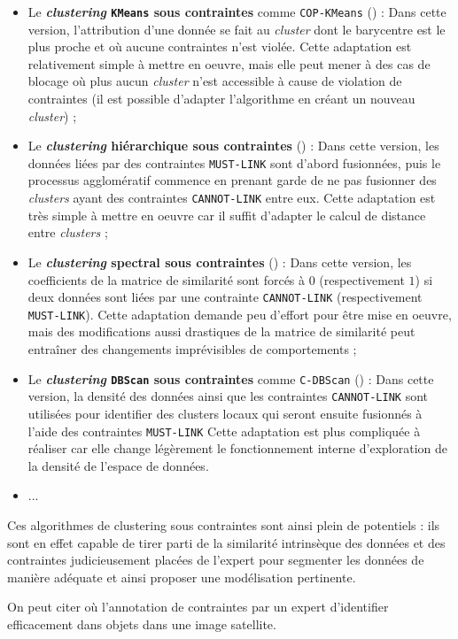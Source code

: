 		\begin{itemize}
			\item Le \textbf{\textit{clustering} \texttt{KMeans} sous contraintes} comme \texttt{COP-KMeans} (\cite{wagstaff-etal:2001:constrained-kmeans-clustering}) :
			Dans cette version, l'attribution d'une donnée se fait au \textit{cluster} dont le barycentre est le plus proche et où aucune contraintes n'est violée.
			Cette adaptation est relativement simple à mettre en oeuvre, mais elle peut mener à des cas de blocage où plus aucun \textit{cluster} n'est accessible à cause de violation de contraintes (il est possible d’adapter l'algorithme en créant un nouveau \textit{cluster}) ;
			\item Le \textbf{\textit{clustering} hiérarchique sous contraintes} (\cite{davidson-ravi:2005:agglomerative-hierarchical-clustering}) :
			Dans cette version, les données liées par des contraintes \texttt{MUST-LINK} sont d'abord fusionnées, puis le processus agglomératif commence en prenant garde de ne pas fusionner des \textit{clusters} ayant des contraintes \texttt{CANNOT-LINK} entre eux.
			Cette adaptation est très simple à mettre en oeuvre car il suffit d'adapter le calcul de distance entre \textit{clusters} ;
			\item Le \textbf{\textit{clustering} spectral sous contraintes} (\cite{kamvar-etal:2003:spectral-learning}) :
			Dans cette version, les coefficients de la matrice de similarité sont forcés à $0$ (respectivement $1$) si deux données sont liées par une contrainte \texttt{CANNOT-LINK} (respectivement \texttt{MUST-LINK}).
			Cette adaptation demande peu d'effort pour être mise en oeuvre, mais des modifications aussi drastiques de la matrice de similarité peut entraîner des changements imprévisibles de comportements ;
			\item Le \textbf{\textit{clustering} \texttt{DBScan} sous contraintes} comme \texttt{C-DBScan} (\cite{ruiz-etal:2010:densitybased-semisupervised-clustering}) :
			Dans cette version, la densité des données ainsi que les contraintes \texttt{CANNOT-LINK} sont utilisées pour identifier des clusters locaux qui seront ensuite fusionnés à l'aide des contraintes \texttt{MUST-LINK}
			Cette adaptation est plus compliquée à réaliser car elle change légèrement le fonctionnement interne d'exploration de la densité de l'espace de données.
			\item ...
		\end{itemize}
		
		Ces algorithmes de clustering sous contraintes sont ainsi plein de potentiels : ils sont en effet capable de tirer parti de la similarité intrinsèque des données et des contraintes judicieusement placées de l'expert pour segmenter les données de manière adéquate et ainsi proposer une modélisation pertinente.
		\begin{leftBarExamples}
			On peut citer \cite{lampert-etal:2019:constrained-distance-based} où l'annotation de contraintes par un expert d'identifier efficacement dans objets dans une image satellite.
		\end{leftBarExamples}
		
